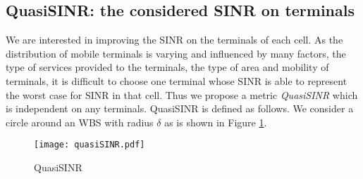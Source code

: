 \subsection{QuasiSINR: the considered SINR on terminals}
We are interested in improving the SINR on the terminals of each cell.
As the distribution of mobile terminals is varying and influenced by many factors, \ie the type of services provided to the terminals, the type of area and mobility of terminals, it is difficult to choose one terminal whose SINR is able to represent the worst case for SINR in that cell.
Thus we propose a metric \textit{QuasiSINR} which is independent on any terminals.
QuasiSINR is defined as follows.
We consider a circle around an WBS with radius $\delta$ as is shown in Figure \ref{quasiSINRfigure}.

\begin{figure}[h!]
  \centering
  \texttt{[image: quasiSINR.pdf]}
  \caption{QuasiSINR}
\label{quasiSINRfigure}
\end{figure}

